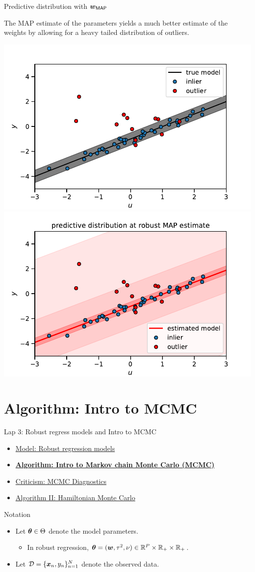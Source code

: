 \documentclass[aspectratio=169]{beamer}
\begin{document}
\begin{frame}{Predictive distribution with $\boldsymbol{w}_{\mathsf{MAP}}$}

The MAP estimate of the parameters yields a much better estimate of the weights by allowing for a heavy tailed distribution of outliers.

\centering
\includegraphics[width=.49\textwidth]{figures/lap3/data.pdf}
\includegraphics[width=.49\textwidth]{figures/lap3/robust_map_pred.pdf}
    
\end{frame}

\section{Algorithm: Intro to MCMC}
\label{sec:intro_mcmc}

\begin{frame}{Lap 3: Robust regress models and Intro to MCMC}
\begin{itemize}
    \item \hyperref[sec:robust_regression]{Model: Robust regression models}
    \item \hyperref[sec:intro_mcmc]{\textbf{Algorithm: Intro to Markov chain Monte Carlo (MCMC)}}
    \item \hyperref[sec:diagnostics]{Criticism: MCMC Diagnostics}
    \item \hyperref[sec:hmc]{Algorithm II: Hamiltonian Monte Carlo}
\end{itemize}
\end{frame}


\begin{frame}{Notation}
\begin{itemize}
    \item Let $\boldsymbol{\theta} \in \Theta$ denote the model parameters. 
    \begin{itemize}
        \item In robust regression, $\boldsymbol{\theta} = (\boldsymbol{w}, \tau^2, \nu) \in \mathbb{R}^P \times \mathbb{R}_+ \times \mathbb{R}_+$.
    \end{itemize}
    
    \item Let $\mathcal{D} = \{\boldsymbol{x}_n, y_n\}_{n=1}^N$ denote the observed data.
\end{itemize}
    
\end{frame}
\end{document}
